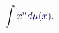 \documentclass[12pt]{article}
\begin{document}
\makeatletter
\renewcommand*{\@textcolor}[3]{%
  \protect\leavevmode
  \begingroup
    \color#1{#2}#3%
  \endgroup
}
\makeatother
\begin{displaymath}
\mathcolor[RGB]{0,0,15}{\int} \mathcolor[RGB]{0,0,30}{x} ^ { \mathcolor[RGB]{0,0,45}{n} } \mathcolor[RGB]{0,0,60}{d} \mathcolor[RGB]{0,0,75}{\mu} \mathcolor[RGB]{0,0,90}{(} \mathcolor[RGB]{0,0,105}{x} \mathcolor[RGB]{0,0,120}{)} \mathcolor[RGB]{0,0,135}{.}
\end{displaymath}
\end{document}
